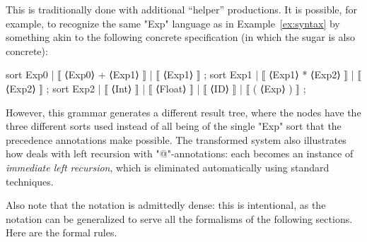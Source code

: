 \documentclass[12pt]{article} %
\begin{document}
{\small\begin{remark} This is traditionally done with additional ``helper'' productions. It is
    possible, for example, to recognize the same "Exp" language as in Example~\ref{ex:syntax} by
    something akin to the following concrete \HAX specification (in which the sugar is also
    concrete):
  \begin{hacs}[xleftmargin=\parindent]
sort Exp0 | ⟦ ⟨Exp0⟩ + ⟨Exp1⟩ ⟧ | ⟦ ⟨Exp1⟩ ⟧ ;
sort Exp1 | ⟦ ⟨Exp1⟩ * ⟨Exp2⟩ ⟧ | ⟦ ⟨Exp2⟩ ⟧ ;
sort Exp2 | ⟦ ⟨Int⟩ ⟧ | ⟦ ⟨Float⟩ ⟧ | ⟦ ⟨ID⟩ ⟧ | ⟦ ( ⟨Exp⟩ ) ⟧ ;
  \end{hacs}%
  However, this grammar generates a different result tree, where the nodes have the three different
  sorts used instead of all being of the single "Exp" sort that the precedence annotations make
  possible.  The transformed system also illustrates how \HAX deals with left recursion with
  "@"-annotations: each becomes an instance of \emph{immediate left recursion}, which is eliminated
  automatically using standard techniques.
\end{remark}}

Also note that the notation is admittedly dense: this is intentional, as the notation can be
generalized to serve all the formalisms of the following sections.  Here are the formal rules.
\end{document}
